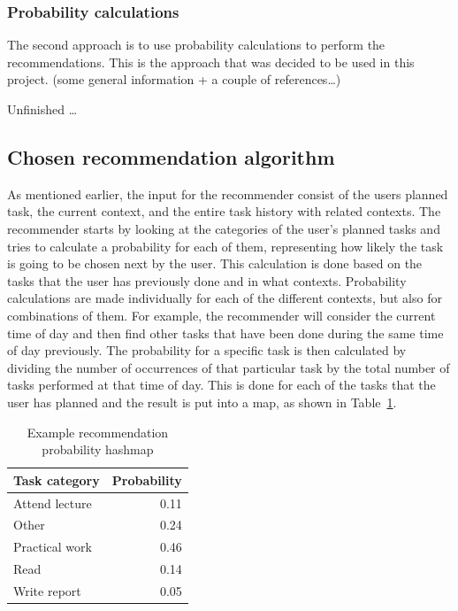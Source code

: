 \subsubsection{Probability calculations}
The second approach is to use probability calculations to perform the recommendations. This is the approach that was decided to be used in this project. (some general information + a couple of references\ldots)

Unfinished \ldots

\subsection{Chosen recommendation algorithm}

As mentioned earlier, the input for the recommender consist of the users planned task, the current context, and the entire task history with related contexts. The recommender starts by looking at the categories of the user's planned tasks and tries to calculate a probability for each of them, representing how likely the task is going to be chosen next by the user. This calculation is done based on the tasks that the user has previously done and in what contexts. Probability calculations are made individually for each of the different contexts, but also for combinations of them. For example, the recommender will consider the current time of day and then find other tasks that have been done during the same time of day previously. The probability for a specific task is then calculated by dividing the number of occurrences of that particular task by the total number of tasks performed at that time of day. This is done for each of the tasks that the user has planned and the result is put into a map, as shown in Table~\ref{tab:probabilitymaptimeofday}.
\begin{table}[tbp]
  \centering
  \begin{tabular}{|l|r|}
	\hline
	\textbf{Task category} & \textbf{Probability} \\
	\hline
	Attend lecture & 0.11 \\
  \hline
	Other & 0.24 \\
	\hline
	Practical work & 0.46 \\
	\hline
	Read & 0.14 \\
	\hline
	Write report & 0.05 \\
	\hline
  \end{tabular}
  \caption{Example recommendation probability hashmap}
  \label{tab:probabilitymaptimeofday}
\end{table}

